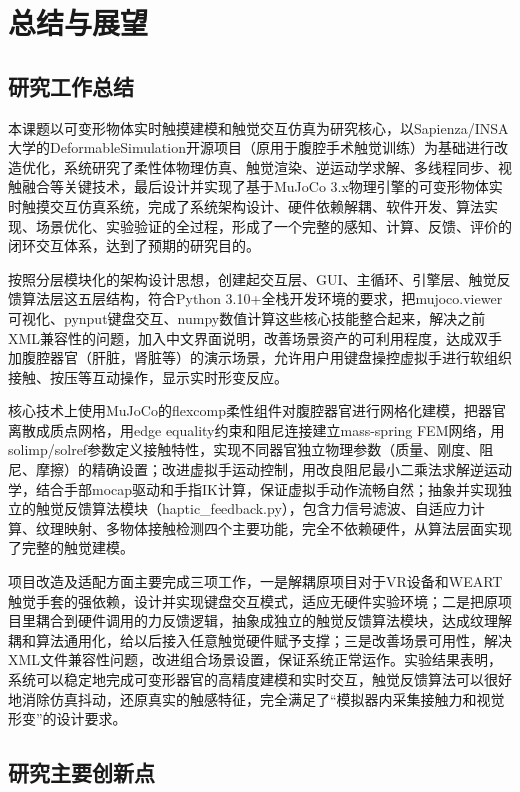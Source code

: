 
\chapter{总结与展望}

\section{研究工作总结}

本课题以可变形物体实时触摸建模和触觉交互仿真为研究核心，以Sapienza/INSA大学的DeformableSimulation开源项目（原用于腹腔手术触觉训练）为基础进行改造优化，系统研究了柔性体物理仿真、触觉渲染、逆运动学求解、多线程同步、视触融合等关键技术，最后设计并实现了基于MuJoCo
3.x物理引擎的可变形物体实时触摸交互仿真系统，完成了系统架构设计、硬件依赖解耦、软件开发、算法实现、场景优化、实验验证的全过程，形成了一个完整的感知、计算、反馈、评价的闭环交互体系，达到了预期的研究目的。

按照分层模块化的架构设计思想，创建起交互层、GUI、主循环、引擎层、触觉反馈算法层这五层结构，符合Python
3.10+全栈开发环境的要求，把mujoco.viewer可视化、pynput键盘交互、numpy数值计算这些核心技能整合起来，解决之前XML兼容性的问题，加入中文界面说明，改善场景资产的可利用程度，达成双手加腹腔器官（肝脏，肾脏等）的演示场景，允许用户用键盘操控虚拟手进行软组织接触、按压等互动操作，显示实时形变反应。

核心技术上使用MuJoCo的flexcomp柔性组件对腹腔器官进行网格化建模，把器官离散成质点网格，用edge
equality约束和阻尼连接建立mass-spring
FEM网络，用solimp/solref参数定义接触特性，实现不同器官独立物理参数（质量、刚度、阻尼、摩擦）的精确设置；改进虚拟手运动控制，用改良阻尼最小二乘法求解逆运动学，结合手部mocap驱动和手指IK计算，保证虚拟手动作流畅自然；抽象并实现独立的触觉反馈算法模块（haptic\_feedback.py），包含力信号滤波、自适应力计算、纹理映射、多物体接触检测四个主要功能，完全不依赖硬件，从算法层面实现了完整的触觉建模。

项目改造及适配方面主要完成三项工作，一是解耦原项目对于VR设备和WEART触觉手套的强依赖，设计并实现键盘交互模式，适应无硬件实验环境；二是把原项目里耦合到硬件调用的力反馈逻辑，抽象成独立的触觉反馈算法模块，达成纹理解耦和算法通用化，给以后接入任意触觉硬件赋予支撑；三是改善场景可用性，解决XML文件兼容性问题，改进组合场景设置，保证系统正常运作。实验结果表明，系统可以稳定地完成可变形器官的高精度建模和实时交互，触觉反馈算法可以很好地消除仿真抖动，还原真实的触感特征，完全满足了``模拟器内采集接触力和视觉形变''的设计要求。

\section{研究主要创新点}


